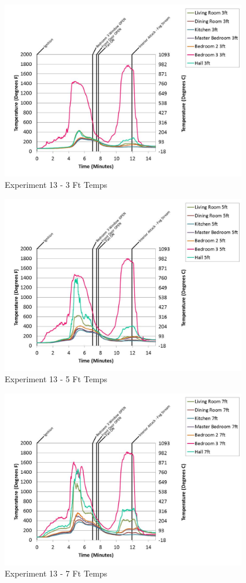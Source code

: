 \documentclass{article}
\begin{document}
\begin{appendices}
	\begin{figure}[h!]
		\centering
		\includegraphics[height=3.05in]{0_Images/Results_Charts/Exp_13_Charts/3FtTemps.pdf}
		\caption{Experiment 13 - 3 Ft Temps}
	\end{figure}
 
	\clearpage

	\begin{figure}[h!]
		\centering
		\includegraphics[height=3.05in]{0_Images/Results_Charts/Exp_13_Charts/5FtTemps.pdf}
		\caption{Experiment 13 - 5 Ft Temps}
	\end{figure}
 

	\begin{figure}[h!]
		\centering
		\includegraphics[height=3.05in]{0_Images/Results_Charts/Exp_13_Charts/7FtTemps.pdf}
		\caption{Experiment 13 - 7 Ft Temps}
	\end{figure}
 

\end{appendices}
\end{document}

